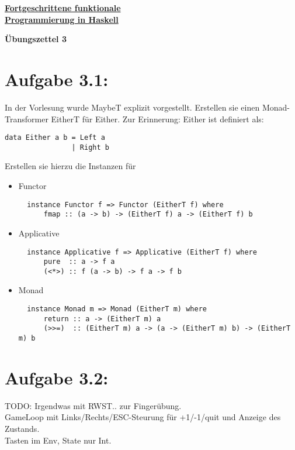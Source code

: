 \documentclass[a4paper,10pt]{scrartcl}
\newcommand{\underfat}[1]{\underline{\textbf{#1}}}
\newcommand{\theuebungszettel}{3}
\begin{document}
\begin{center}
  \begin{huge}
    \underfat{Fortgeschrittene funktionale}\\
    \underfat{Programmierung in Haskell}\\
  \end{huge}
\begin{LARGE}
\textbf{Übungszettel \theuebungszettel}
\end{LARGE}
\end{center}
\section*{Aufgabe \theuebungszettel.1:}
In der Vorlesung wurde MaybeT explizit vorgestellt. Erstellen sie einen Monad-Transformer EitherT für Either. Zur Erinnerung: Either ist definiert als:
\begin{verbatim}
data Either a b = Left a
                | Right b
\end{verbatim}
Erstellen sie hierzu die Instanzen für
\begin{itemize}
 \item Functor
       \begin{verbatim}
  instance Functor f => Functor (EitherT f) where
      fmap :: (a -> b) -> (EitherT f) a -> (EitherT f) b
       \end{verbatim}
 \item Applicative
       \begin{verbatim}
  instance Applicative f => Applicative (EitherT f) where
      pure  :: a -> f a
      (<*>) :: f (a -> b) -> f a -> f b
       \end{verbatim}
 \item Monad
       \begin{verbatim}
  instance Monad m => Monad (EitherT m) where
      return :: a -> (EitherT m) a
      (>>=)  :: (EitherT m) a -> (a -> (EitherT m) b) -> (EitherT m) b
       \end{verbatim}
\end{itemize}
\section*{Aufgabe \theuebungszettel.2:}
TODO: Irgendwas mit RWST.. zur Fingerübung.\\
GameLoop mit Links/Rechts/ESC-Steurung für +1/-1/quit und Anzeige des Zustands.\\
Tasten im Env, State nur Int.
\end{document}
